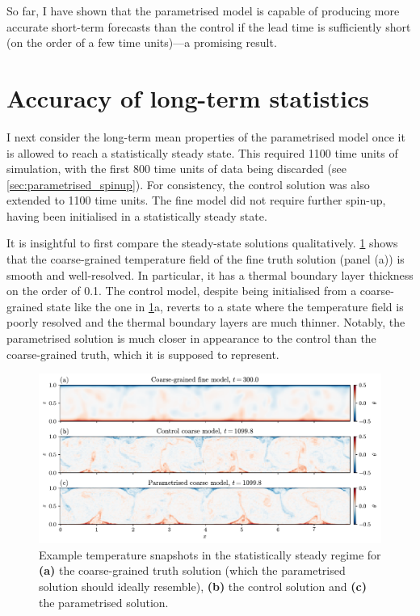 \documentclass[../main.tex]{subfiles}
\begin{document}
So far, I have shown that the parametrised model is capable of producing
more accurate short-term forecasts than the control if the lead time is
sufficiently short (on the order of a few time units)---a promising result.


\section{Accuracy of long-term statistics} \label{sec:climate}
I next consider the long-term mean properties of the parametrised model once it
is allowed to reach a statistically steady state. This required 1100 time units
of simulation, with the first 800 time units of data being discarded (see
\cref{sec:parametrised_spinup}). For consistency, the control solution was
also extended to 1100 time units. The fine model did not require further
spin-up, having been initialised in a statistically steady state.

It is insightful to first compare the steady-state solutions qualitatively.
\cref{fig:steady_state_vis} shows that the coarse-grained temperature field of
the fine truth solution (panel (a)) is smooth and well-resolved. In particular,
it has a thermal boundary layer thickness on the order of 0.1. The control
model, despite being initialised from a coarse-grained state like the one in
\cref{fig:steady_state_vis}a, reverts to a state where the temperature field is
poorly resolved and the thermal boundary layers are much thinner. Notably, the
parametrised solution is much closer in appearance to the control than the
coarse-grained truth, which it is supposed to represent.

\begin{figure}[ht]
    \centering
    \includegraphics[width=\linewidth]{figures/steady_state_vis.pdf}
    \caption{
        Example temperature snapshots in the statistically steady regime for
        \textbf{(a)} the coarse-grained truth solution (which the parametrised
        solution should ideally resemble), \textbf{(b)} the control solution
        and \textbf{(c)} the parametrised solution.
    }
    \label{fig:steady_state_vis}
\end{figure}
\end{document}
